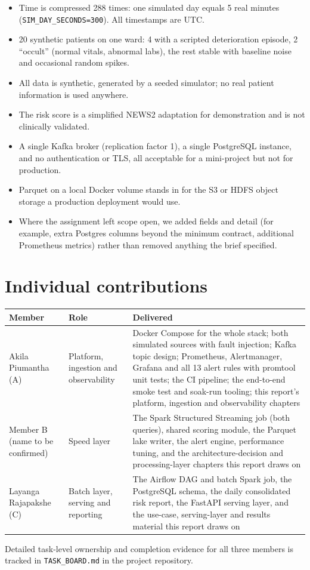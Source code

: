 \documentclass[11pt,a4paper]{article}
\newcommand{\code}[1]{\texttt{\small #1}}
\begin{document}
\begin{itemize}[leftmargin=1.2em]
\item Time is compressed 288 times: one simulated day equals 5 real minutes (\code{SIM\_DAY\_SECONDS=300}). All timestamps are UTC.
\item 20 synthetic patients on one ward: 4 with a scripted deterioration episode, 2 ``occult'' (normal vitals, abnormal labs), the rest stable with baseline noise and occasional random spikes.
\item All data is synthetic, generated by a seeded simulator; no real patient information is used anywhere.
\item The risk score is a simplified NEWS2 adaptation for demonstration and is not clinically validated.
\item A single Kafka broker (replication factor 1), a single PostgreSQL instance, and no authentication or TLS, all acceptable for a mini-project but not for production.
\item Parquet on a local Docker volume stands in for the S3 or HDFS object storage a production deployment would use.
\item Where the assignment left scope open, we added fields and detail (for example, extra Postgres columns beyond the minimum contract, additional Prometheus metrics) rather than removed anything the brief specified.
\end{itemize}

\section{Individual contributions}

\begin{longtable}{@{}L{3.6cm}L{3.4cm}L{7.4cm}@{}}
\toprule
\textbf{Member} & \textbf{Role} & \textbf{Delivered} \\
\midrule
\endhead
Akila Piumantha (A) & Platform, ingestion and observability &
Docker Compose for the whole stack; both simulated sources with fault injection; Kafka topic design; Prometheus, Alertmanager, Grafana and all 13 alert rules with promtool unit tests; the CI pipeline; the end-to-end smoke test and soak-run tooling; this report's platform, ingestion and observability chapters \\
Member B (name to be confirmed) & Speed layer &
The Spark Structured Streaming job (both queries), shared scoring module, the Parquet lake writer, the alert engine, performance tuning, and the architecture-decision and processing-layer chapters this report draws on \\
Layanga Rajapakshe (C) & Batch layer, serving and reporting &
The Airflow DAG and batch Spark job, the PostgreSQL schema, the daily consolidated risk report, the FastAPI serving layer, and the use-case, serving-layer and results material this report draws on \\
\bottomrule
\end{longtable}

Detailed task-level ownership and completion evidence for all three members is tracked in
\code{TASK\_BOARD.md} in the project repository.
\end{document}

